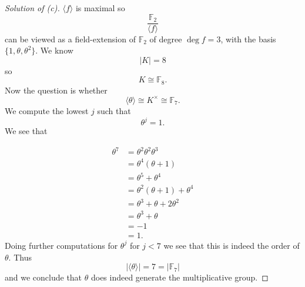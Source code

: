 \begin{proof}[Solution of (c)]
    $\langle f \rangle$ is maximal so 
    \[
        \frac{\mathbb F_2}{\langle f \rangle}
    \]
    can be viewed as a field-extension of $\mathbb F_2$ of 
    degree $\deg f = 3$, with the 
    basis $\{1, \theta, \theta^2\}$. We know 
    \[
        |K| = 8
    \]
    so 
    \[
        K \cong \mathbb F_8.
    \]
    Now the question is whether 
    \[
        \langle \theta \rangle 
        \cong K^\times \cong \mathbb F_7.
    \]
    We compute the lowest $j$ such that
    \[
        \theta^j = 1.
    \]
    We see that 

    \begin{align*}
        \theta^7 
        &= \theta^2\theta^2\theta^3 \\ 
        &= \theta^4(\theta + 1) \\ 
        &= \theta^5 + \theta^4 \\ 
        &= \theta^2(\theta + 1) + \theta^4 \\ 
        &= \theta^3 + \theta + 2\theta^2 \\ 
        &= \theta^3 + \theta \\ 
        &= -1 \\ 
        &= 1. 
    \end{align*}
    Doing further computations for $\theta^j$ for $j < 7$ we see 
    that this is indeed the order of $\theta$. Thus 
    \[
        |\langle \theta \rangle| = 7 = |\mathbb F_7|
    \]
    and we conclude that 
    $\theta$ does indeed generate the multiplicative group.

\end{proof}

